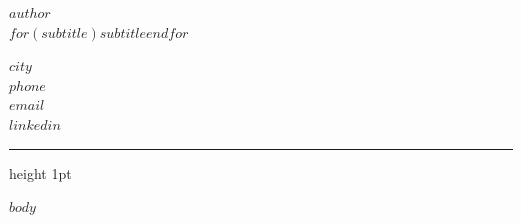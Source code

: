 \documentclass[11pt,a4paper]{article}
\begin{document}
\noindent\begin{minipage}[t]{0.55\linewidth}
  {\fontsize{20}{24}\selectfont\bfseries $author$}\\[1mm]
  {\color{muted}\fontsize{10.5}{13}\selectfont $for(subtitle)$$subtitle$$endfor$}
\end{minipage}\hfill\begin{minipage}[t]{0.4\linewidth}
  \raggedleft\color{muted}\fontsize{8.5}{12}\selectfont
  $city$\\
  $phone$\\
  $email$\\
  $linkedin$
\end{minipage}

\vspace{2mm}\hrule height 1pt

$body$
\end{document}
